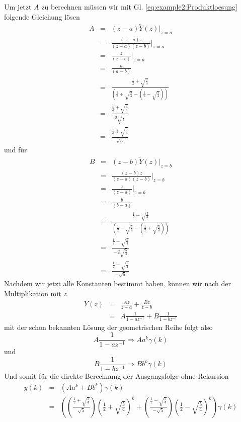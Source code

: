Um jetzt $A$ zu berechnen müssen wir mit Gl.
\ref{eq:example2:Produktloesung} folgende Gleichung lösen
\begin{eqnarray}\label{eq:example2:partialA}
A &= &(z-a)\widetilde{Y}(z)\big|_{z = a}\\
& = &\frac{(z-a)z}{(z-a)(z-b)}\big|_{z = a}\\
& = &\frac{z}{(z-b)}\big|_{z = a}\\
& = &\frac{a}{(a-b)}\\
& =
&\frac{\frac{1}{2}+\sqrt{\frac{5}{4}}}{\left(\frac{1}{2}+\sqrt{\frac{5}{4}}-\left(\frac{1}{2}-\sqrt{\frac{5}{4}}\right)\right)}\\
& =
&\frac{\frac{1}{2}+\sqrt{\frac{5}{4}}}{2\sqrt{\frac{5}{4}}}\\
& = &\frac{\frac{1}{2}+\sqrt{\frac{5}{4}}}{\sqrt{5}}
\end{eqnarray}
und für
\begin{eqnarray}\label{eq:example2:partial1B}
B &= &(z-b)\widetilde{Y}(z)\big|_{z = b}\\
& = &\frac{(z-b)z}{(z-a)(z-b)}\big|_{z = b}\\
& = &\frac{z}{(z-a)}\big|_{z = b}\\
& = &\frac{b}{(b-a)}\\
& =
&\frac{\frac{1}{2}-\sqrt{\frac{5}{4}}}{\left(\frac{1}{2}-\sqrt{\frac{5}{4}}-\left(\frac{1}{2}+\sqrt{\frac{5}{4}}\right)\right)}\\
& =
&\frac{\frac{1}{2}-\sqrt{\frac{5}{4}}}{-2\sqrt{\frac{5}{4}}}\\
&=&\frac{\frac{1}{2}-\sqrt{\frac{5}{4}}}{-\sqrt{5}}
\end{eqnarray}
Nachdem wir jetzt alle Konstanten bestimmt haben, können wir nach
der Multiplikation mit $z$
\begin{eqnarray}\label{eq:example2:kLoseung1}
Y(z) &=& \frac{Az}{z-a} + \frac{Bz}{z-b}\\
& = &A\frac{1}{1-az^{-1}} + B\frac{1}{1-bz^{-1}}
\end{eqnarray}
mit der schon bekannten Lösung der geometrischen Reihe folgt also
\begin{equation}\label{eq:esample2:Loesung1k}
A\frac{1}{1-az^{-1}} \Rightarrow Aa^k\gamma(k)
\end{equation}
und
\begin{equation}\label{eq:esample2:Loesung2k}
B\frac{1}{1-bz^{-1}} \Rightarrow Bb^k\gamma(k)
\end{equation}
Und somit für die direkte Berechnung der Ausgangsfolge ohne
Rekursion
\begin{eqnarray}\label{eq:example2:kLoseungEnde}
y(k) &=& (Aa^k+Bb^k)\gamma(k)\\\nonumber
&=&\left(\left(\frac{\frac{1}{2}+\sqrt{\frac{5}{4}}}{\sqrt{5}}\right)\left( \frac{1}{2}+\sqrt{\frac{5}{4}}\right)^k    +
\left(\frac{\frac{1}{2}-\sqrt{\frac{5}{4}}}{-\sqrt{5}}\right)\left(
\frac{1}{2}-\sqrt{\frac{5}{4}}\right)^k\right)\gamma(k)
\end{eqnarray}

